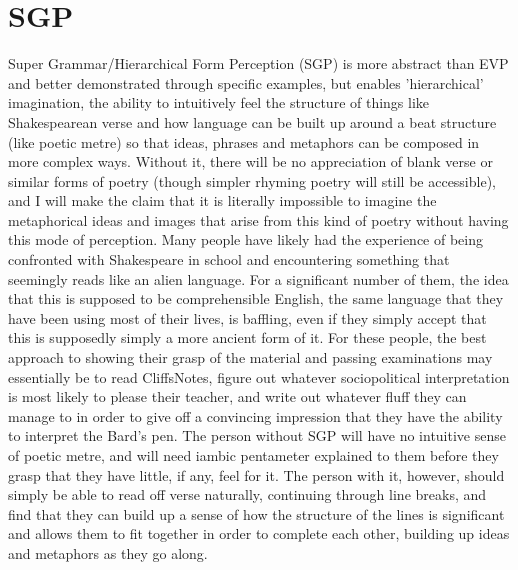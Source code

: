 \documentclass[]{article}
\begin{document}
\section{SGP}

Super Grammar/Hierarchical Form Perception (SGP) is more abstract than EVP and better demonstrated through specific examples, but enables 'hierarchical' imagination, the ability to intuitively feel the structure of things like Shakespearean verse and how language can be built up around a beat structure (like poetic metre) so that ideas, phrases and metaphors can be composed in more complex ways. Without it, there will be no appreciation of blank verse or similar forms of poetry (though simpler rhyming poetry will still be accessible), and I will make the claim that it is literally impossible to imagine the metaphorical ideas and images that arise from this kind of poetry without having this mode of perception. Many people have likely had the experience of being confronted with Shakespeare in school and encountering something that seemingly reads like an alien language. For a significant number of them, the idea that this is supposed to be comprehensible English, the same language that they have been using most of their lives, is baffling, even if they simply accept that this is supposedly simply a more ancient form of it. For these people, the best approach to showing their grasp of the material and passing examinations may essentially be to read CliffsNotes, figure out whatever sociopolitical interpretation is most likely to please their teacher, and write out whatever fluff they can manage to in order to give off a convincing impression that they have the ability to interpret the Bard's pen. The person without SGP will have no intuitive sense of poetic metre, and will need iambic pentameter explained to them before they grasp that they have little, if any, feel for it. The person with it, however, should simply be able to read off verse naturally, continuing through line breaks, and find that they can build up a sense of how the structure of the lines is significant and allows them to fit together in order to complete each other, building up ideas and metaphors as they go along.
\end{document}
